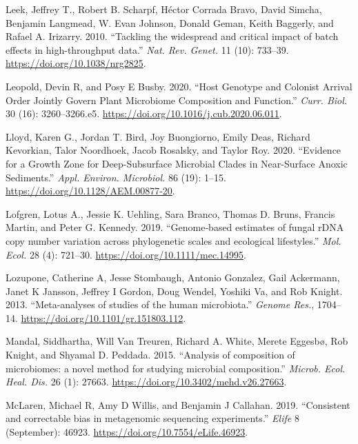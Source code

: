 \documentclass[
]{article}
\newlength{\cslhangindent}
\newlength{\cslentryspacingunit} %
\newenvironment{CSLReferences}[2] %
 {%
  \setlength{\parindent}{0pt}
  \ifodd #1
  \let\oldpar\par
  \def\par{\hangindent=\cslhangindent\oldpar}
  \fi
  \setlength{\parskip}{#2\cslentryspacingunit}
 }%
 {}
\begin{document}
\begin{CSLReferences}{1}{0}
\leavevmode{}%
Leek, Jeffrey T., Robert B. Scharpf, Héctor Corrada Bravo, David Simcha, Benjamin Langmead, W. Evan Johnson, Donald Geman, Keith Baggerly, and Rafael A. Irizarry. 2010. {``{Tackling the widespread and critical impact of batch effects in high-throughput data}.''} \emph{Nat. Rev. Genet.} 11 (10): 733--39. \url{https://doi.org/10.1038/nrg2825}.

\leavevmode{}%
Leopold, Devin R, and Posy E Busby. 2020. {``{Host Genotype and Colonist Arrival Order Jointly Govern Plant Microbiome Composition and Function}.''} \emph{Curr. Biol.} 30 (16): 3260--3266.e5. \url{https://doi.org/10.1016/j.cub.2020.06.011}.

\leavevmode{}%
Lloyd, Karen G., Jordan T. Bird, Joy Buongiorno, Emily Deas, Richard Kevorkian, Talor Noordhoek, Jacob Rosalsky, and Taylor Roy. 2020. {``{Evidence for a Growth Zone for Deep-Subsurface Microbial Clades in Near-Surface Anoxic Sediments}.''} \emph{Appl. Environ. Microbiol.} 86 (19): 1--15. \url{https://doi.org/10.1128/AEM.00877-20}.

\leavevmode{}%
Lofgren, Lotus A., Jessie K. Uehling, Sara Branco, Thomas D. Bruns, Francis Martin, and Peter G. Kennedy. 2019. {``{Genome‐based estimates of fungal rDNA copy number variation across phylogenetic scales and ecological lifestyles}.''} \emph{Mol. Ecol.} 28 (4): 721--30. \url{https://doi.org/10.1111/mec.14995}.

\leavevmode{}%
Lozupone, Catherine A, Jesse Stombaugh, Antonio Gonzalez, Gail Ackermann, Janet K Jansson, Jeffrey I Gordon, Doug Wendel, Yoshiki Va, and Rob Knight. 2013. {``{Meta-analyses of studies of the human microbiota}.''} \emph{Genome Res.}, 1704--14. \url{https://doi.org/10.1101/gr.151803.112}.

\leavevmode{}%
Mandal, Siddhartha, Will Van Treuren, Richard A. White, Merete Eggesbø, Rob Knight, and Shyamal D. Peddada. 2015. {``{Analysis of composition of microbiomes: a novel method for studying microbial composition}.''} \emph{Microb. Ecol. Heal. Dis.} 26 (1): 27663. \url{https://doi.org/10.3402/mehd.v26.27663}.

\leavevmode{}%
McLaren, Michael R, Amy D Willis, and Benjamin J Callahan. 2019. {``{Consistent and correctable bias in metagenomic sequencing experiments}.''} \emph{Elife} 8 (September): 46923. \url{https://doi.org/10.7554/eLife.46923}.


\end{CSLReferences}
\end{document}
